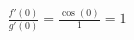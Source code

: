 \documentclass[preview]{standalone}
\begin{document}
\begin{align*}
\frac{f'(0)}{g'(0)} = \frac{\cos(0)}{1} = 1
\end{align*}
\end{document}

